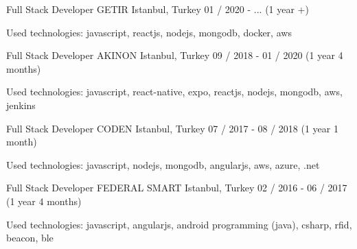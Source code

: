 

\begin{cventries}

  \cventry
    {Full Stack Developer} %
    {GETIR} %
    {Istanbul, Turkey} %
    {01 / 2020 - ... (1 year +)}
    {
      \begin{cvitems} %
        \item {Used technologies: javascript, reactjs, nodejs, mongodb, docker, aws }
      \end{cvitems}
    }

  \cventry
    {Full Stack Developer} %
    {AKINON} %
    {Istanbul, Turkey} %
    {09 / 2018 - 01 / 2020 (1 year 4 months)}
    {
      \begin{cvitems} %
        \item {Used technologies: javascript, react-native, expo, reactjs, nodejs, mongodb, aws, jenkins }
      \end{cvitems}
    }

  \cventry
    {Full Stack Developer} %
    {CODEN} %
    {Istanbul, Turkey} %
    {07 / 2017 - 08 / 2018 (1 year 1 month)}
    {
      \begin{cvitems} %
        \item {Used technologies: javascript, nodejs, mongodb, angularjs, aws, azure, .net }
      \end{cvitems}
    }

  \cventry
    {Full Stack Developer} %
    {FEDERAL SMART} %
    {Istanbul, Turkey} %
    {02 / 2016 - 06 / 2017 (1 year 4 months)}
    {
      \begin{cvitems} %
        \item {Used technologies: javascript, angularjs, android programming (java), csharp, rfid, beacon, ble }
      \end{cvitems}
    }

\end{cventries}
